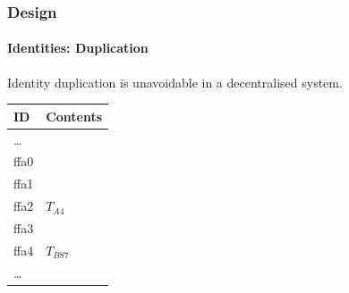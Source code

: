 \documentclass{beamer}
\begin{document}
	\begin{frame}
		\frametitle{Design}
		\framesubtitle{Identities: Duplication}
		Identity duplication is unavoidable in a decentralised system.
		\begin{table}[]
			\begin{tabular}{l|l}
				\textbf{ID} & \textbf{Contents}\\\hline
				\dots & \\\hline
				ffa0 & \\\hline
				ffa1 & \\\hline
				ffa2 & $T_{A4}$ \visible<2->{, \textcolor{red}{$T_{C102}$}}\\\hline
				ffa3 & \\\hline
				ffa4 & $T_{B87}$\\\hline
				\dots & \\
			\end{tabular}
		\end{table}
	\end{frame}
\end{document}

